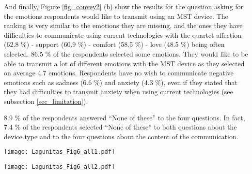 \documentclass[acmsmall]{acmart}
\begin{document}
And finally, Figure \ref{fig_convey2} (b) show the results for the question asking for the emotions respondents would like to transmit using an MST device. The ranking is very similar to the emotions they are missing, and the ones they have difficulties to communicate using current technologies with the quartet affection (62.8 \%) - support (60.9 \%) - comfort (58.5 \%) - love (48.5 \%) being often selected. 86.5 \% of the respondents selected some emotions. They would like to be able to transmit a lot of different emotions with the MST device as they selected on average 4.7 emotions. Respondents have no wish to communicate negative emotions such as sadness (6.6 \%) and anxiety (4.3 \%), even if they stated that they had difficulties to transmit anxiety when using current technologies (see subsection \ref{sec_limitation}).

8.9 \% of the respondents answered “None of these” to the four questions. In fact, 7.4 \% of the respondents selected “None of these” to both questions about the device type and to the four questions about the content of the communication.

\begin{figure*}[!t]
	\centering
	\texttt{[image: Lagunitas\_Fig6\_all1.pdf]}
	\caption{Content of the mediated social touch interaction that respondents would like to have. (a) The social relationships and (b) the types of social touch}
	\label{fig_convey1}
\end{figure*}

\begin{figure*}[!t]
	\centering
	\texttt{[image: Lagunitas\_Fig6\_all2.pdf]}
	\caption{Content of the mediated social touch interaction that respondents would like to have. (a) The gestures and (b) the emotions they would like to convey}
	\label{fig_convey2}
\end{figure*}
\end{document}
